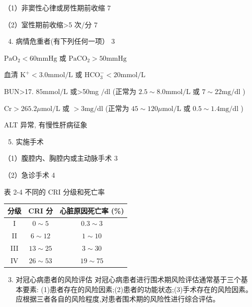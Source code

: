\documentclass[10pt]{article}
\begin{document}
（1）非窦性心律或房性期前收缩 7

（2）室性期前收缩>5 次/分 7

\begin{enumerate}
  \setcounter{enumi}{3}
  \item 病情危重者(有下列任何一项） 3
\end{enumerate}

$\mathrm{PaO}_{2}<60 \mathrm{mmHg}$ 或 $\mathrm{PaCO}_{2}>50 \mathrm{mmHg}$

血清 $\mathrm{K}^{+}<3.0 \mathrm{mmol} / \mathrm{L}$ 或 $\mathrm{HCO}_{3}^{-}<20 \mathrm{mmol} / \mathrm{L}$

BUN>17. $85 \mathrm{mmol} / \mathrm{L}$ 或>50mg $/ \mathrm{dl}$ (正常为 $2.5 \sim 8.0 \mathrm{mmol} / \mathrm{L}$ 或 $7 \sim 22 \mathrm{mg} / \mathrm{dl}$ )

$\mathrm{Cr}>265.2 \mu \mathrm{mol} / \mathrm{L}$ 或 $>3 \mathrm{mg} / \mathrm{dl}$ (正常为 $45 \sim 120 \mu \mathrm{mol} / \mathrm{L}$ 或 $0.5 \sim 1.4 \mathrm{mg} / \mathrm{dl}$ )

ALT 异常, 有慢性肝病征象

\begin{enumerate}
  \setcounter{enumi}{4}
  \item 实施手术
\end{enumerate}

（1）腹腔内、胸腔内或主动脉手术 3

（2）急诊手术 4

表 2-4 不同的 CRI 分级和死亡率

\begin{center}
\begin{tabular}{ccc}
\hline
分级 & CRI 分 & 心脏原因死亡率 (\%) \\
\hline
I & $0 \sim 5$ & $0.3 \sim 3$ \\
II & $6 \sim 12$ & $1 \sim 10$ \\
III & $13 \sim 25$ & $3 \sim 30$ \\
IV & $26 \sim 53$ & $19 \sim 75$ \\
\hline
\end{tabular}
\end{center}

\begin{enumerate}
  \setcounter{enumi}{2}
  \item 对冠心病患者的风险评估 对冠心病患者进行围术期风险评估通常基于三个基本要素: (1)患者存在的风险因素;(2)患者的功能状态;(3)手术存在的风险因素。应根据三者各自的风险程度,对患者围术期的风险性进行综合评估。
\end{enumerate}
\end{document}
